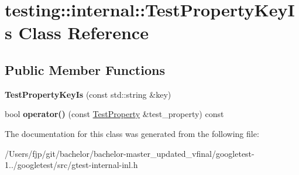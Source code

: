 \hypertarget{classtesting_1_1internal_1_1_test_property_key_is}{}\section{testing\+:\+:internal\+:\+:Test\+Property\+Key\+Is Class Reference}
\label{classtesting_1_1internal_1_1_test_property_key_is}
\subsection*{Public Member Functions}
\begin{DoxyCompactItemize}
\item 
\mbox{\label{classtesting_1_1internal_1_1_test_property_key_is_a509ed1271caa1032e40c5d811b3da385}} 
{\bfseries Test\+Property\+Key\+Is} (const std\+::string \&key)
\item 
\mbox{\label{classtesting_1_1internal_1_1_test_property_key_is_abf5eb5bf22065e0614ffe36d093e885e}} 
bool {\bfseries operator()} (const \mbox{\hyperlink{classtesting_1_1_test_property}{Test\+Property}} \&test\+\_\+property) const
\end{DoxyCompactItemize}


The documentation for this class was generated from the following file\+:\begin{DoxyCompactItemize}
\item 
/\+Users/fjp/git/bachelor/bachelor-\/master\+\_\+updated\+\_\+vfinal/googletest-\/1../googletest/src/gtest-\/internal-\/inl.\+h\end{DoxyCompactItemize}
